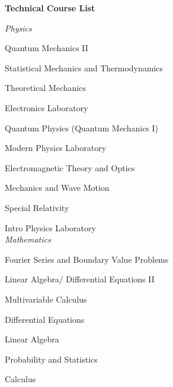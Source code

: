 \documentclass[9pt]{article}
\begin{document}
\newpage

%
%

\noindent
{\bf Technical Course List \\}
\vspace{-7mm}

\begin{multicols}{2}
\noindent
{\it Physics} \\
\setlength{\parindent}{5mm}
\setlength{\parskip}{-5.5mm}
\par Quantum Mechanics II \\
\par Statistical Mechanics and Thermodynamics \\
\par Theoretical Mechanics \\
\par Electronics Laboratory \\
\par Quantum Physics (Quantum Mechanics I) \\
\par Modern Physics Laboratory \\
\par Electromagnetic Theory and Optics \\
\par Mechanics and Wave Motion \\
\par Special Relativity \\
\par Intro Physics Laboratory \\

\vspace{3mm}
\noindent
{\it Mathematics} \\
\par Fourier Series and Boundary Value Problems \\
\par Linear Algebra/ Differential Equations II \\
\par Multivariable Calculus \\
\par Differential Equations \\
\par Linear Algebra \\
\par Probability and Statistics \\
\par Calculus \\


\end{multicols}
\end{document}
